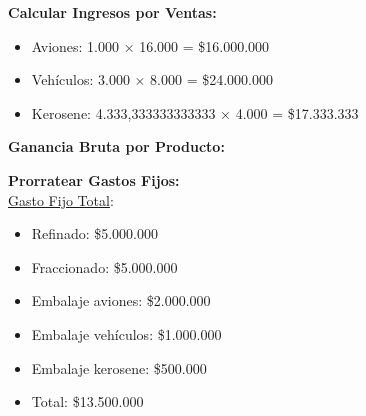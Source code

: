 \documentclass[10pt,a4paper]{article}
\begin{document}
\begin{enumerate}
\begin{itemize}
    \end{itemize}

    \textbf{Calcular Ingresos por Ventas:}

    \begin{itemize}

        \item Aviones: 1.000 × 16.000 = \$16.000.000
        \item Vehículos: 3.000 × 8.000 = \$24.000.000
        \item Kerosene: 4.333,333333333333 × 4.000 = \$17.333.333 \\

    \end{itemize}

    \vspace{0.5em}

    \textbf{Ganancia Bruta por Producto:}

    \begin{center}
    \end{center}
    
    \vspace{1em}

    \textbf{Prorratear Gastos Fijos:} \\

    \underline{Gasto Fijo Total}:

    \begin{itemize}

        \item Refinado: \$5.000.000
        \item Fraccionado: \$5.000.000
        \item Embalaje aviones: \$2.000.000
        \item Embalaje vehículos: \$1.000.000
        \item Embalaje kerosene: \$500.000 \\
        \item Total: \$13.500.000 \\


\end{itemize}
\end{enumerate}
\end{document}
